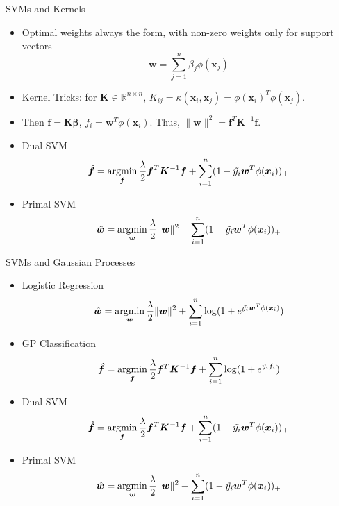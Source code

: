 \documentclass[10pt,mathserif]{beamer}
\begin{document}
\begin{frame}{SVMs and Kernels}
\begin{itemize}
    \item Optimal weights always the form, with non-zero weights only for support vectors
    \begin{equation*}
        \bm{w} = \sum_{j=1}^n \beta_j \phi(\bm{x}_j)
    \end{equation*}
    \item Kernel Tricks: for $\bm{K} \in \mathbb{R}^{n \times n}$, $K_{ij} = \kappa(\bm{x}_i,\bm{x}_j) = \phi(\bm{x}_i)^T \phi(\bm{x}_j)$.
    \item Then $\bm{f} = \bm{K}\bm{\beta}$,  $f_i = \bm{w}^T\phi(\bm{x}_i)$. Thus, $\|\bm{w}\|^2 = \bm{f}^T\bm{K}^{-1}\bm{f}$.
    \item Dual SVM
    \begin{equation*}
        \hat{\bm{f}} = \mathop{\rm argmin}_{\bm{f}} \frac{\lambda}{2}\bm{f}^T \bm{K}^{-1}\bm{f} + \sum_{i=1}^n (1-\tilde{y_i} \bm{w}^T\phi(\bm{x}_i))_+
    \end{equation*}
    \item Primal SVM
    \begin{equation*}
        \hat{\bm{w}} = \mathop{\rm argmin}_{\bm{w}} \frac{\lambda}{2}\|\bm{w}\|^2 + \sum_{i=1}^n (1-\tilde{y_i} \bm{w}^T\phi(\bm{x}_i))_+
    \end{equation*}
\end{itemize}
\end{frame}

\begin{frame}{SVMs and Gaussian Processes}
\begin{itemize}
    \item Logistic Regression
    \begin{equation*}
        \hat{\bm{w}} = \mathop{\rm argmin}_{\bm{w}} \frac{\lambda}{2}\|\bm{w}\|^2 + \sum_{i=1}^n \log(1+ e^{\tilde{y_i} \bm{w}^T\phi(\bm{x}_i)})
    \end{equation*}
    \item GP Classification
    \begin{equation*}
        \hat{\bm{f}} = \mathop{\rm argmin}_{\bm{f}} \frac{\lambda}{2}\bm{f}^T \bm{K}^{-1}\bm{f} + \sum_{i=1}^n \log(1+ e^{\tilde{y_i} f_i})
    \end{equation*}
    \item Dual SVM
    \begin{equation*}
        \hat{\bm{f}} = \mathop{\rm argmin}_{\bm{f}} \frac{\lambda}{2}\bm{f}^T \bm{K}^{-1}\bm{f} + \sum_{i=1}^n (1-\tilde{y_i} \bm{w}^T\phi(\bm{x}_i))_+
    \end{equation*}
    \item Primal SVM
    \begin{equation*}
        \hat{\bm{w}} = \mathop{\rm argmin}_{\bm{w}} \frac{\lambda}{2}\|\bm{w}\|^2 + \sum_{i=1}^n (1-\tilde{y_i} \bm{w}^T\phi(\bm{x}_i))_+
    \end{equation*}
\end{itemize}
\end{frame}
\end{document}
